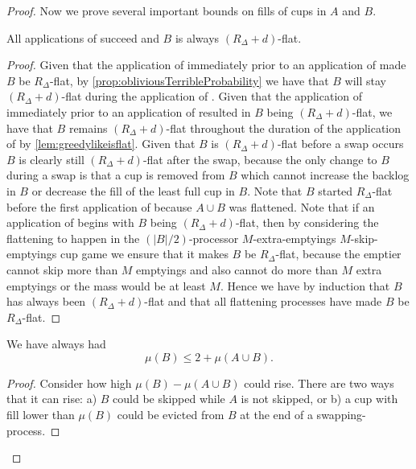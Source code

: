\begin{proof}
Now we prove several important bounds on fills of cups in $A$ and $B$.
\begin{clm}
  \label{clm:allflatteningsworkbyM}
  All applications of \flatalg succeed and $B$ is always
  $(R_\Delta + d)$-flat.
\end{clm}
\begin{proof}
  Given that the application of \flatalg immediately prior to an application
  of \randalg made $B$ be $R_\Delta$-flat, by
  \cref{prop:obliviousTerribleProbability} we have that $B$ will
  stay $(R_\Delta + d)$-flat during the application of \randalg. 
  Given that the application of \randalg immediately prior to an
  application of \flatalg resulted in $B$ being $(R_\Delta
  + d)$-flat, we have that $B$ remains $(R_\Delta + d)$-flat
  throughout the duration of the application of \flatalg by
  \cref{lem:greedylikeisflat}. Given that $B$ is $(R_\Delta +
  d)$-flat before a swap occurs $B$ is clearly still $(R_\Delta +
  d)$-flat after the swap, because the only change to $B$ during
  a swap is that a cup is removed from $B$ which cannot increase
  the backlog in $B$ or decrease the fill of the least full cup
  in $B$. Note that $B$ started $R_\Delta$-flat before the first
  application of \flatalg because $A\cup B$ was flattened.
  Note that if an application of \flatalg begins with $B$ being
  $(R_\Delta + d)$-flat, then by considering the flattening to
  happen in the $(|B|/2)$-processor $M$-extra-emptyings
  $M$-skip-emptyings cup game we ensure that it makes $B$ be
  $R_\Delta$-flat, because the emptier cannot skip more than $M$
  emptyings and also cannot do more than $M$ extra emptyings or
  the mass would be at least $M$.
  Hence we have by induction that $B$ has always been $(R_\Delta
  + d)$-flat and that all flattening processes have made $B$ be
  $R_\Delta$-flat. 
\end{proof}

\begin{clm}
  \label{clm:muBdoesntgettoobig}
  We have always had
  $$\mu(B) \le 2 + \mu(A\cup B).$$
\end{clm}
\begin{proof}
  Consider how high $\mu(B)-\mu(A\cup B)$ could rise. There are
  two ways that it can rise: a) $B$ could be skipped while $A$
  is not skipped, or b) a cup with fill lower than $\mu(B)$
  could be evicted from $B$ at the end of a swapping-process. 


\end{proof}
\end{proof}

